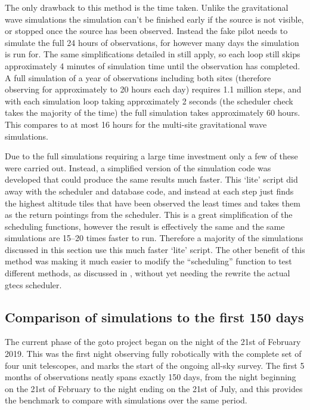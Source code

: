 \begin{colsection}
\begin{colsection}
The only drawback to this method is the time taken. Unlike the gravitational wave simulations the simulation can't be finished early if the source is not visible, or stopped once the source has been observed. Instead the fake pilot needs to simulate the full 24 hours of observations, for however many days the simulation is run for. The same simplifications detailed in  still apply, so each loop still skips approximately 4 minutes of simulation time until the observation has completed. A full simulation of a year of observations including both sites (therefore observing for approximately to 20 hours each day) requires 1.1 million steps, and with each simulation loop taking approximately 2 seconds (the scheduler check takes the majority of the time) the full simulation takes approximately 60 hours. This compares to at most 16 hours for the multi-site gravitational wave simulations.

Due to the full simulations requiring a large time investment only a few of these were carried out. Instead, a simplified version of the simulation code was developed that could produce the same results much faster. This `lite' script did away with the scheduler and database code, and instead at each step just finds the highest altitude tiles that have been observed the least times and takes them as the return pointings from the scheduler. This is a great simplification of the scheduling functions, however the result is effectively the same and the same simulations are 15--20 times faster to run. Therefore a majority of the simulations discussed in this section use this much faster `lite' script. The other benefit of this method was making it much easier to modify the ``scheduling'' function to test different methods, as discussed in , without yet needing the rewrite the actual \gls{gtecs} scheduler.

\end{colsection}


\subsection{Comparison of simulations to the first 150 days}
\label{sec:allsky_sim_existing}
\begin{colsection}

The current phase of the \gls{goto} project began on the night of the 21st of February 2019. This was the first night observing fully robotically with the complete set of four unit telescopes, and marks the start of the ongoing all-sky survey. The first 5 months of observations neatly spans exactly 150 days, from the night beginning on the 21st of February to the night ending on the 21st of July, and this provides the benchmark to compare with simulations over the same period.


\end{colsection}
\end{colsection}

